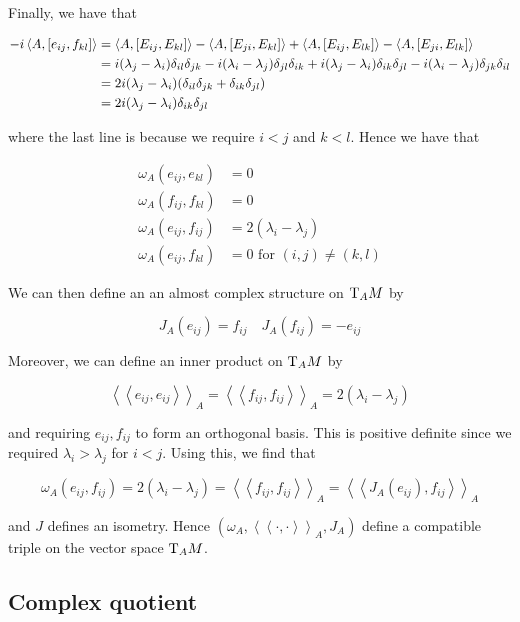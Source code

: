 \documentclass{article}
\newcommand{\iinner}[1]{\left\langle\!\left\langle #1 \right\rangle\!\right\rangle}
\begin{document}
Finally, we have that

\begin{align*}
    -i\left\langle A, [e_{ij}, f_{kl}] \right\rangle &= \left\langle A, [E_{ij}, E_{kl}] \right\rangle - \left\langle A, [E_{ji}, E_{kl}] \right\rangle + \left\langle A, [E_{ij}, E_{lk}] \right\rangle - \left\langle A, [E_{ji}, E_{lk}] \right\rangle \\
    &= i(\lambda_j - \lambda_i)\delta_{il}\delta_{jk} - i(\lambda_i - \lambda_j)\delta_{jl}\delta_{ik} + i(\lambda_j - \lambda_i)\delta_{ik}\delta_{jl} - i(\lambda_i - \lambda_j)\delta_{jk}\delta_{il} \\
    &= 2i(\lambda_j - \lambda_i)(\delta_{il}\delta_{jk} + \delta_{ik}\delta_{jl}) \\
    &= 2i(\lambda_j - \lambda_i)\delta_{ik}\delta_{jl}
\end{align*}

where the last line is because we require \(i < j\) and \(k < l\). Hence we have that

\begin{align*}
    \omega_A(e_{ij}, e_{kl}) &= 0 \\
    \omega_A(f_{ij}, f_{kl}) &= 0 \\
    \omega_A(e_{ij}, f_{ij}) &= 2(\lambda_i - \lambda_j) \\
    \omega_A(e_{ij}, f_{kl}) &= 0 \text{ for }(i, j) \ne (k, l)
\end{align*}

We can then define an an almost complex structure on \(\mathrm{T}_AM\) by

\begin{equation}
    \label{eq:cx-str-vector}
    J_A(e_{ij}) = f_{ij} \quad J_A(f_{ij}) = -e_{ij}
\end{equation}

Moreover, we can define an inner product on \(\mathrm{T}_AM\) by

\[\iinner{e_{ij}, e_{ij}}_A = \iinner{f_{ij}, f_{ij}}_A = 2(\lambda_i - \lambda_j)\]

and requiring \(e_{ij}, f_{ij}\) to form an orthogonal basis. This is positive definite since we required \(\lambda_i > \lambda_j\) for \(i < j\). Using this, we find that

\[\omega_A(e_{ij}, f_{ij}) = 2(\lambda_i - \lambda_j) = \iinner{f_{ij}, f_{ij}}_A = \iinner{J_A(e_{ij}), f_{ij}}_A\]

and \(J\) defines an isometry. Hence \((\omega_A, \iinner{\cdot, \cdot}_A, J_A)\) define a compatible triple on the vector space \(\mathrm{T}_AM\).

\subsection{Complex quotient}
\end{document}
